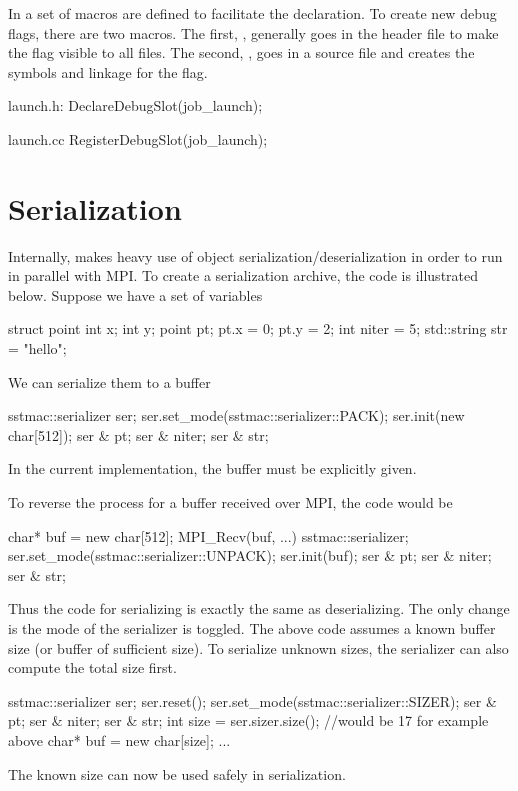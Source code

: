 In  a set of macros are defined to facilitate the declaration.
To create new debug flags, there are two macros.
The first, , generally goes in the header file to make the flag visible to all files.
The second, , goes in a source file and creates the symbols and linkage for the flag.

\begin{CppCode}
launch.h:
DeclareDebugSlot(job_launch);

launch.cc
RegisterDebugSlot(job_launch);
\end{CppCode}

\section{Serialization}\label{sec:serialize}
Internally, \sstmacro makes heavy use of object serialization/deserialization in order to run in parallel with MPI.
To create a serialization archive, the code is illustrated below. Suppose we have a set of variables

\begin{CppCode}
struct point {
 int x;
 int y;
}
point pt;
pt.x = 0;
pt.y = 2;
int niter = 5;
std::string str = "hello";
\end{CppCode}

We can serialize them to a buffer

\begin{CppCode}
sstmac::serializer ser;
ser.set_mode(sstmac::serializer::PACK);
ser.init(new char[512]);
ser & pt;
ser & niter;
ser & str;
\end{CppCode}
In the current implementation, the buffer must be explicitly given.

To reverse the process for a buffer received over MPI, the code would be

\begin{CppCode}
char* buf = new char[512];
MPI_Recv(buf, ...)
sstmac::serializer;
ser.set_mode(sstmac::serializer::UNPACK);
ser.init(buf);
ser & pt;
ser & niter;
ser & str;
\end{CppCode}

Thus the code for serializing is exactly the same as deserializing. The only change is the mode of the serializer is toggled.
The above code assumes a known buffer size (or buffer of sufficient size).
To serialize unknown sizes, the serializer can also compute the total size first.

\begin{CppCode}
sstmac::serializer ser;
ser.reset();
ser.set_mode(sstmac::serializer::SIZER);
ser & pt;
ser & niter;
ser & str;
int size = ser.sizer.size(); //would be 17 for example above
char* buf = new char[size];
...
\end{CppCode}
The known size can now be used safely in serialization.

